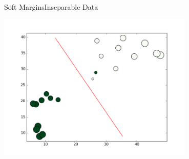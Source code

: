 \documentclass[xcolor=dvipsnames]{beamer}
\begin{document}
\begin{frame}{Soft Margins}{Inseparable Data}
    \begin{center}
        \includegraphics[width=0.7\textwidth]{figs/nonsep.png}\\
    \end{center}
\end{frame}
\end{document}

